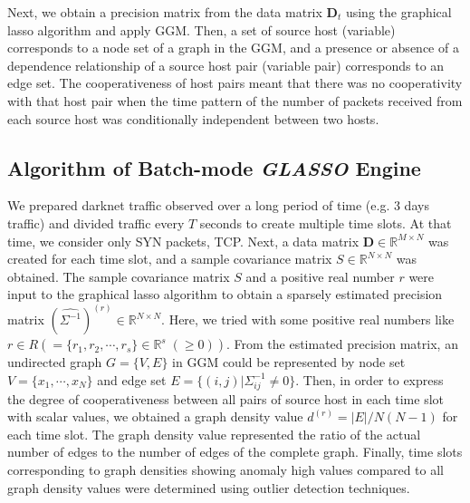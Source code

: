 \documentclass[conference]{IEEEtran}
\begin{document}
Next, we obtain a precision matrix from the data matrix $\bm{D}_t$ using the graphical lasso algorithm and apply GGM.
Then, a set of source host (variable) corresponds to a node set of a graph in the GGM, and a presence or absence of a dependence relationship of a source host pair (variable pair) corresponds to an edge set.
The cooperativeness of host pairs meant that there was no cooperativity with that host pair when the time pattern of the number of packets received from each source host was conditionally independent between two hosts.




\subsection{Algorithm of Batch-mode {\it GLASSO} Engine}
We prepared darknet traffic observed over a long period of time (e.g. 3 days traffic) and divided traffic every $T$ seconds to create multiple time slots.
At that time, we consider only SYN packets, TCP.
Next, a data matrix $\bm{D}\in\mathbb{R}^{M \times N}$ was created for each time slot, and a sample covariance matrix $S\in\mathbb{R}^{N \times N}$ was obtained.
The sample covariance matrix $S$ and a positive real number $r$ were input to the graphical lasso algorithm to obtain a sparsely estimated precision matrix ${(\hat{\Sigma^{-1}})}^{(r)}\in\mathbb{R}^{N \times N}$.
Here, we tried with some positive real numbers like $r \in R ( = \{r_1, r_2, \cdots, r_s\}\in\mathbb{R}^s\;(\geq 0))$.
From the estimated precision matrix, an undirected graph $G = \{V, E\}$ in GGM could be represented by node set $V=\{x_{1}, \cdots, x_{N}\}$ and edge set $E=\{(i,j)|\Sigma^{-1}_{ij}\neq0\}$.
Then, in order to express the degree of cooperativeness between all pairs of source host in each time slot with scalar values, we obtained a graph density value $d^{(r)}=|E|/N(N-1)$ for each time slot.
The graph density value represented the ratio of the actual number of edges to the number of edges of the complete graph.
Finally, time slots corresponding to graph densities showing anomaly high values compared to all graph density values were determined using outlier detection techniques.
\end{document}
